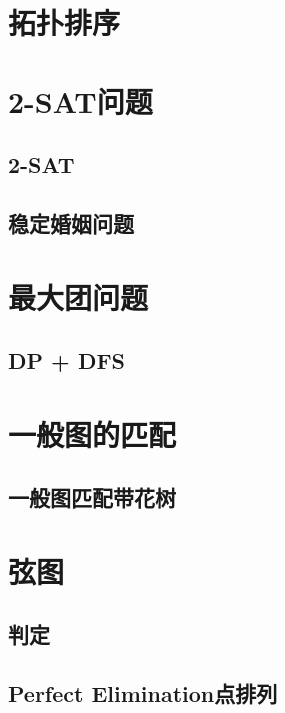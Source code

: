 \section{拓扑排序}



\section{2-SAT问题}
\subsection{2-SAT}


\subsection{稳定婚姻问题}





\section{最大团问题}
\subsection{DP + DFS}



\section{一般图的匹配}
\subsection{一般图匹配带花树}


\section{弦图}
\subsection{判定}


\subsection{Perfect Elimination点排列}




\endinput %
